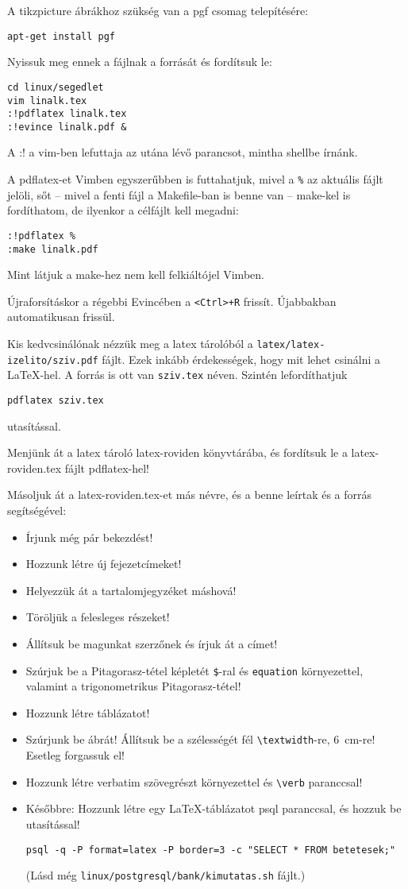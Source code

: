 \documentclass[a4paper]{article}
\newcommand{\code}{\texttt}
\begin{document}
A tikzpicture ábrákhoz szükség van a pgf csomag telepítésére:

\begin{Verbatim}
apt-get install pgf
\end{Verbatim}

Nyissuk meg ennek a fájlnak a forrását és fordítsuk le:
\begin{Verbatim}
cd linux/segedlet
vim linalk.tex
:!pdflatex linalk.tex
:!evince linalk.pdf &
\end{Verbatim}
A :! a vim-ben lefuttaja az utána lévő parancsot, mintha shellbe írnánk.

A pdflatex-et Vimben egyszerűbben is futtahatjuk, mivel a \verb!%! az
aktuális fájlt jelöli, sőt -- mivel a fenti fájl a Makefile-ban is benne
van -- make-kel is fordíthatom, de ilyenkor a célfájlt kell megadni:
\begin{Verbatim}
:!pdflatex %
:make linalk.pdf
\end{Verbatim}
Mint látjuk a make-hez nem kell felkiáltójel Vimben.

Újraforsításkor a régebbi Evincében a \verb!<Ctrl>+R! frissít.
Újabbakban automatikusan frissül.

Kis kedvcsinálónak nézzük meg a latex tárolóból a
\code{latex/latex-izelito/sziv.pdf} fájlt.
Ezek inkább érdekességek, hogy mit lehet csinálni a \LaTeX-hel.
A forrás is ott van \code{sziv.tex} néven. Szintén lefordíthatjuk

\verb"pdflatex sziv.tex"

utasítással.

Menjünk át a latex tároló latex-roviden könyvtárába, és fordítsuk le a
latex-roviden.tex fájlt pdflatex-hel!

Másoljuk át a latex-roviden.tex-et más névre, és a benne leírtak
és a forrás segítségével:
\begin{itemize}
\item Írjunk még pár bekezdést!
\item Hozzunk létre új fejezetcímeket!
\item Helyezzük át a tartalomjegyzéket máshová!
\item Töröljük a felesleges részeket!
\item Állítsuk be magunkat szerzőnek és írjuk át a címet!
\item Szúrjuk be a Pitagorasz-tétel képletét \verb+$+-ral és
 \code{equation} környezettel, valamint a trigonometrikus
 Pitagorasz-tétel!
\item Hozzunk létre táblázatot!
\item Szúrjunk be ábrát! Állítsuk be a szélességét fél
\verb+\textwidth+-re, 6~cm-re! Esetleg forgassuk el!
\item Hozzunk létre verbatim szövegrészt környezettel és \verb+\verb+
paranccsal!
\item Későbbre: Hozzunk létre egy \LaTeX-táblázatot psql paranccsal, és
 hozzuk be \verb++ utasítással!
\begin{Verbatim}
psql -q -P format=latex -P border=3 -c "SELECT * FROM betetesek;"
\end{Verbatim}
 (Lásd még \verb!linux/postgresql/bank/kimutatas.sh! fájlt.)
\end{itemize}
\end{document}
